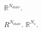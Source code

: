 \textsf{
	$\mathbb{R}^{N_\mathrm{state}}$.
}

\textsf{
	$R^{N_\mathrm{state}}$.
}
\textsf{
	$\mathbb{R}^{N_s}$.
}

